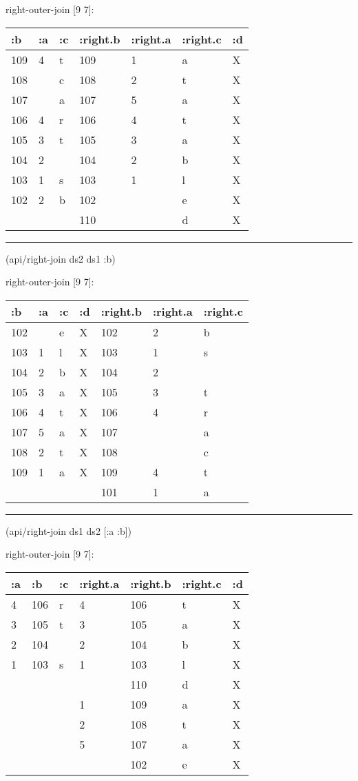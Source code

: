 \documentclass[]{article}
\newenvironment{Shaded}{\begin{snugshade}}{\end{snugshade}}
\newcommand{\AttributeTok}[1]{\textcolor[rgb]{0.77,0.63,0.00}{#1}}
\newcommand{\NormalTok}[1]{#1}
\begin{document}
right-outer-join {[}9 7{]}:

\begin{longtable}[]{@{}lllllll@{}}
\toprule
:b & :a & :c & :right.b & :right.a & :right.c & :d\tabularnewline
\midrule
\endhead
109 & 4 & t & 109 & 1 & a & X\tabularnewline
108 & & c & 108 & 2 & t & X\tabularnewline
107 & & a & 107 & 5 & a & X\tabularnewline
106 & 4 & r & 106 & 4 & t & X\tabularnewline
105 & 3 & t & 105 & 3 & a & X\tabularnewline
104 & 2 & & 104 & 2 & b & X\tabularnewline
103 & 1 & s & 103 & 1 & l & X\tabularnewline
102 & 2 & b & 102 & & e & X\tabularnewline
& & & 110 & & d & X\tabularnewline
\bottomrule
\end{longtable}

\begin{center}\rule{0.5\linewidth}{0.5pt}\end{center}

\begin{Shaded}
\begin{Highlighting}[]
\NormalTok{(api/right-join ds2 ds1 }\AttributeTok{:b}\NormalTok{)}
\end{Highlighting}
\end{Shaded}

right-outer-join {[}9 7{]}:

\begin{longtable}[]{@{}lllllll@{}}
\toprule
:b & :a & :c & :d & :right.b & :right.a & :right.c\tabularnewline
\midrule
\endhead
102 & & e & X & 102 & 2 & b\tabularnewline
103 & 1 & l & X & 103 & 1 & s\tabularnewline
104 & 2 & b & X & 104 & 2 &\tabularnewline
105 & 3 & a & X & 105 & 3 & t\tabularnewline
106 & 4 & t & X & 106 & 4 & r\tabularnewline
107 & 5 & a & X & 107 & & a\tabularnewline
108 & 2 & t & X & 108 & & c\tabularnewline
109 & 1 & a & X & 109 & 4 & t\tabularnewline
& & & & 101 & 1 & a\tabularnewline
\bottomrule
\end{longtable}

\begin{center}\rule{0.5\linewidth}{0.5pt}\end{center}

\begin{Shaded}
\begin{Highlighting}[]
\NormalTok{(api/right-join ds1 ds2 [}\AttributeTok{:a} \AttributeTok{:b}\NormalTok{])}
\end{Highlighting}
\end{Shaded}

right-outer-join {[}9 7{]}:

\begin{longtable}[]{@{}lllllll@{}}
\toprule
:a & :b & :c & :right.a & :right.b & :right.c & :d\tabularnewline
\midrule
\endhead
4 & 106 & r & 4 & 106 & t & X\tabularnewline
3 & 105 & t & 3 & 105 & a & X\tabularnewline
2 & 104 & & 2 & 104 & b & X\tabularnewline
1 & 103 & s & 1 & 103 & l & X\tabularnewline
& & & & 110 & d & X\tabularnewline
& & & 1 & 109 & a & X\tabularnewline
& & & 2 & 108 & t & X\tabularnewline
& & & 5 & 107 & a & X\tabularnewline
& & & & 102 & e & X\tabularnewline
\bottomrule
\end{longtable}
\end{document}
